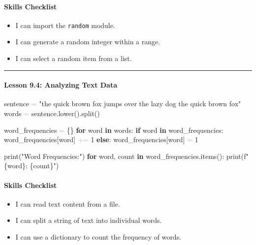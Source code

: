 \documentclass[
  justified,
  openright,
]{tufte-book}
\let\subsection\paragraph
\let\paragraph\paragraph
\newcommand{\KeywordTok}[1]{\textcolor{CodeKeyword}{\textbf{#1}}}  %
\newcommand{\StringTok}[1]{\textcolor{CodeString}{#1}}              %
\newcommand{\CodeNumTok}[1]{\textcolor{CodeNumber}{#1}}             %
\newcommand{\OperatorTok}[1]{\textcolor{DarkGray}{#1}}              %
\newenvironment{Shaded}{%
  \begin{mdframed}[style=TufteCode]%
}{%
  \end{mdframed}%
}
\let\subsection\paragraph
\let\paragraph\paragraph
\providecommand{\tightlist}{%
  \setlength{\itemsep}{0pt}\setlength{\parskip}{0pt}}
\begin{document}
\subsection{Skills Checklist}\label{skills-checklist-44}

\begin{itemize}
\tightlist
\item[$\square$]
  I can import the \texttt{random} module.
\item[$\square$]
  I can generate a random integer within a range.
\item[$\square$]
  I can select a random item from a list.
\end{itemize}

\begin{center}\rule{0.5\linewidth}{0.5pt}\end{center}

\subsection{Lesson 9.4: Analyzing Text
Data}\label{lesson-9.4-analyzing-text-data}

\begin{Shaded}
\begin{Highlighting}[]
sentence \OperatorTok{=} \StringTok{"the quick brown fox jumps over the lazy dog the quick brown fox"}
words \OperatorTok{=} sentence.lower().split()
 
word\_frequencies \OperatorTok{=} \{\}
\KeywordTok{for} word \KeywordTok{in} words:
    \KeywordTok{if} word \KeywordTok{in} word\_frequencies:
        word\_frequencies[word] \OperatorTok{+=} \CodeNumTok{1}
    \KeywordTok{else}:
        word\_frequencies[word] \OperatorTok{=} \CodeNumTok{1}
 
print(\StringTok{"Word Frequencies:"})
\KeywordTok{for} word, count \KeywordTok{in} word\_frequencies.items():
    print(\StringTok{f"\textquotesingle{}}\StringTok{\{}word\StringTok{\}}\StringTok{\textquotesingle{}: }\StringTok{\{}count\StringTok{\}}\StringTok{"})
\end{Highlighting}
\end{Shaded}

\subsection{Skills Checklist}\label{skills-checklist-45}

\begin{itemize}
\tightlist
\item[$\square$]
  I can read text content from a file.
\item[$\square$]
  I can split a string of text into individual words.
\item[$\square$]
  I can use a dictionary to count the frequency of words.
\end{itemize}
\end{document}
